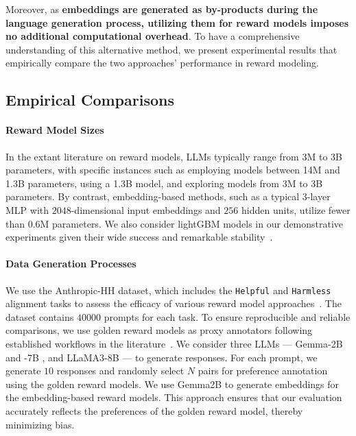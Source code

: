 Moreover, as \textbf{embeddings are generated as by-products during the language generation process, utilizing them for reward models imposes no additional computational overhead}. To have a comprehensive understanding of this alternative method, we present experimental results that empirically compare the two approaches' performance in reward modeling.




\subsection{Empirical Comparisons}
\paragraph{Reward Model Sizes} In the extant literature on reward models, LLMs typically range from 3M to 3B parameters, with specific instances such as \citet{coste2023reward} employing models between 14M and 1.3B parameters, \citet{ahmed2024scalable} using a 1.3B model, and \citet{gao2023scaling} exploring models from 3M to 3B parameters. By contrast, embedding-based methods, such as a typical 3-layer MLP with $2048$-dimensional input embeddings and $256$ hidden units, utilize fewer than 0.6M parameters. We also consider lightGBM models in our demonstrative experiments given their wide success and remarkable stability~\citep{ke2017lightgbm,grinsztajn2022tree,sun2023query}.


\paragraph{Data Generation Processes} We use the Anthropic-HH dataset, which includes the \texttt{Helpful} and \texttt{Harmless} alignment tasks to assess the efficacy of various reward model approaches~\citep{bai2022training}. The dataset contains $40000$ prompts for each task. To ensure reproducible and reliable comparisons, we use golden reward models as proxy annotators following established workflows in the literature~\citep{xiong2023gibbs,dong2024rlhf,dong2023raft,gao2023scaling,yang2024rewards}. We consider three LLMs --- Gemma-2B and -7B \citep{team2024gemma}, and LLaMA3-8B \citep{touvron2023llama} --- to generate responses. For each prompt, we generate $10$ responses and randomly select $N$ pairs for preference annotation using the golden reward models. We use Gemma2B to generate embeddings for the embedding-based reward models. This approach ensures that our evaluation accurately reflects the preferences of the golden reward model, thereby minimizing bias.

